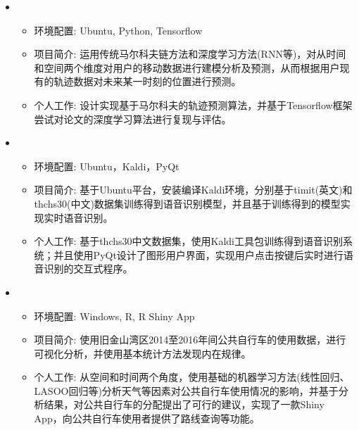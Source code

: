 \begin{itemize}[leftmargin=*]
    \item {}
      {\small
      \begin{itemize}
        \item 环境配置: Ubuntu, Python, Tensorflow
        \item 项目简介: 运用传统马尔科夫链方法和深度学习方法(RNN等)，对从时间和空间两个维度对用户的移动数据进行建模分析及预测，从而根据用户现有的轨迹数据对未来某一时刻的位置进行预测。
        \item 个人工作: 设计实现基于马尔科夫的轨迹预测算法，并基于Tensorflow框架尝试对论文的深度学习算法进行复现与评估。 
      \end{itemize}
      }
      
    \item {}
    {\small
    \begin{itemize}
      \item 环境配置: Ubuntu，Kaldi，PyQt
      \item 项目简介: 基于Ubuntu平台，安装编译Kaldi环境，分别基于timit(英文)和thchs30(中文)数据集训练得到语音识别模型，并且基于训练得到的模型实现实时语音识别。
      \item 个人工作: 基于thchs30中文数据集，使用Kaldi工具包训练得到语音识别系统；并且使用PyQt设计了图形用户界面，实现用户点击按键后实时进行语音识别的交互式程序。
    \end{itemize}
    }
    
    \item {}
	  {\small
	  \begin{itemize}
	    \item 环境配置: Windows, R, R Shiny App
	    \item 项目简介: 使用旧金山湾区2014至2016年间公共自行车的使用数据，进行可视化分析，并使用基本统计方法发现内在规律。
	    \item 个人工作: 从空间和时间两个角度，使用基础的机器学习方法(线性回归、LASOO回归等)分析天气等因素对公共自行车使用情况的影响，并基于分析结果，对公共自行车的分配提出了可行的建议，实现了一款Shiny App，向公共自行车使用者提供了路线查询等功能。
	  \end{itemize}
	  }


\end{itemize}
